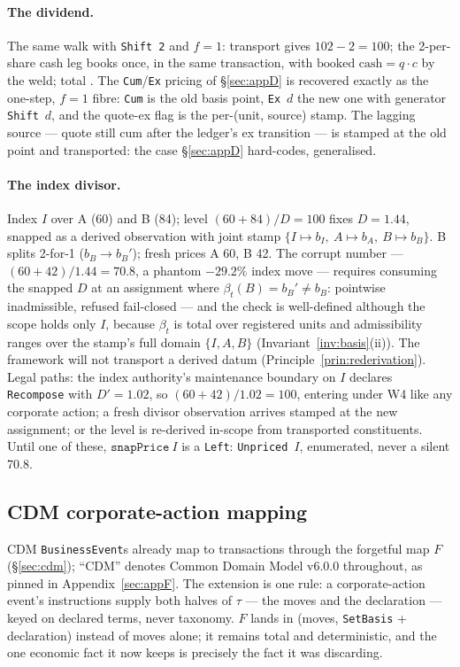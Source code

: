 \paragraph{The dividend.} The same walk with \texttt{Shift 2} and $f=1$: transport gives
$102-2=100$; the 2-per-share cash leg books once, in the same transaction, with
$\text{booked cash}=q\cdot c$ by the weld; total . The
\texttt{Cum}/\texttt{Ex} pricing of \S\ref{sec:appD} is recovered exactly as the
one-step, $f=1$ fibre: \texttt{Cum} is the old basis point, \texttt{Ex}~$d$ the new one
with generator \texttt{Shift}~$d$, and the quote-ex flag is the per-(unit, source)
stamp. The lagging source --- quote still cum after the ledger's ex transition --- is
stamped at the old point and transported: the case \S\ref{sec:appD} hard-codes,
generalised.

\paragraph{The index divisor.} Index $I$ over A (60) and B (84); level $(60+84)/D=100$
fixes $D=1.44$, snapped as a derived observation with joint stamp
$\{I\mapsto b_I,\ A\mapsto b_A,\ B\mapsto b_B\}$. B splits 2-for-1 ($b_B\to b_B'$);
fresh prices A 60, B 42. The corrupt number --- $(60+42)/1.44=70.8$, a phantom
$-29.2\%$ index move --- requires consuming the snapped $D$ at an assignment where
$\beta_t(B)=b_B'\ne b_B$: pointwise inadmissible, refused fail-closed --- and the check
is well-defined although the scope holds only $I$, because $\beta_t$ is total over
registered units and admissibility ranges over the stamp's full domain $\{I,A,B\}$
(Invariant~\ref{inv:basis}(ii)). The framework will not transport a derived datum
(Principle~\ref{prin:rederivation}). Legal paths: the index authority's maintenance
boundary on $I$ declares \texttt{Recompose} with $D'=1.02$, so $(60+42)/1.02=100$,
entering under W4 like any corporate action; a fresh divisor observation arrives stamped
at the new assignment; or the level is re-derived in-scope from transported
constituents. Until one of these, $\texttt{snapPrice}\ I$ is a \texttt{Left}:
\texttt{Unpriced}~$I$, enumerated, never a silent 70.8.

\subsection{CDM corporate-action mapping}
\label{sec:basis-cdm}

CDM \texttt{BusinessEvent}s already map to transactions through the forgetful map $F$
(\S\ref{sec:cdm}); ``CDM'' denotes Common Domain Model v6.0.0 throughout, as pinned in
Appendix~\ref{sec:appF}. The extension is one rule: a corporate-action event's
instructions supply both halves of $\tau$ --- the moves and the declaration --- keyed on
declared terms, never taxonomy. $F$ lands in (moves, \texttt{SetBasis} + declaration)
instead of moves alone; it remains total and deterministic, and the one economic fact it
now keeps is precisely the fact it was discarding.

